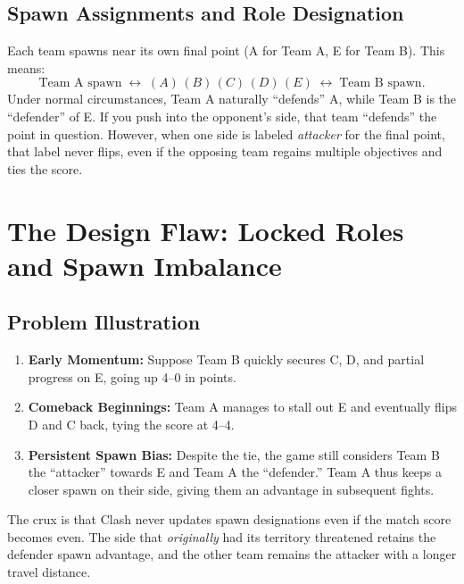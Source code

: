 \documentclass[12pt]{article}
\begin{document}
\subsection{Spawn Assignments and Role Designation}
Each team spawns near its own final point (A for Team A, E for Team B). 
This means:
\[
\text{Team A spawn} \;\longleftrightarrow\; (A)\,(B)\,(C)\,(D)\,(E) 
\;\longleftrightarrow\; \text{Team B spawn}.
\]
Under normal circumstances, Team A naturally ``defends'' A, while Team B is 
the ``defender'' of E. If you push into the opponent's side, that team 
``defends'' the point in question. However, when one side is labeled 
\emph{attacker} for the final point, that label never flips, even if the 
opposing team regains multiple objectives and ties the score.

\section{The Design Flaw: Locked Roles and Spawn Imbalance}
\label{sec:flaw}

\subsection{Problem Illustration}
\begin{enumerate}
    \item \textbf{Early Momentum:} Suppose Team B quickly secures C, D, and partial 
    progress on E, going up 4--0 in points.
    \item \textbf{Comeback Beginnings:} Team A manages to stall out E and eventually 
    flips D and C back, tying the score at 4--4.
    \item \textbf{Persistent Spawn Bias:} Despite the tie, the game still considers 
    Team B the ``attacker'' towards E and Team A the ``defender.'' Team A thus keeps 
    a closer spawn on their side, giving them an advantage in subsequent fights.
\end{enumerate}

The crux is that Clash never updates spawn designations even if the match 
score becomes even. The side that \emph{originally} had its territory 
threatened retains the defender spawn advantage, and the other team remains 
the attacker with a longer travel distance.
\end{document}
